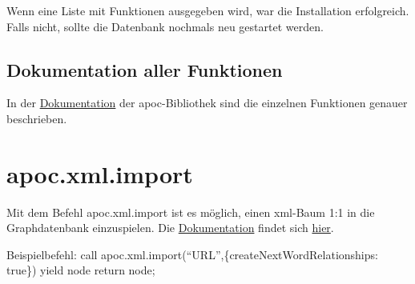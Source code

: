 \documentclass[ngerman,]{scrreprt}
\begin{document}
Wenn eine Liste mit Funktionen ausgegeben wird, war die Installation erfolgreich. Falls nicht, sollte die Datenbank nochmals neu gestartet werden.

\subsection{Dokumentation aller Funktionen}\label{dokumentation-aller-funktionen}

In der \href{https://neo4j-contrib.github.io/neo4j-apoc-procedures/}{Dokumentation} der apoc-Bibliothek sind die einzelnen Funktionen genauer beschrieben.

\section{apoc.xml.import}\label{apoc.xml.import}

Mit dem Befehl apoc.xml.import ist es möglich, einen xml-Baum 1:1 in die Graphdatenbank einzuspielen. Die \href{https://neo4j-contrib.github.io/neo4j-apoc-procedures/\#_import_xml_directly}{Dokumentation} findet sich \href{https://neo4j-contrib.github.io/neo4j-apoc-procedures/\#_import_xml_directly}{hier}.

Beispielbefehl: call apoc.xml.import(``URL'',\{createNextWordRelationships: true\}) yield node return node;
\end{document}
